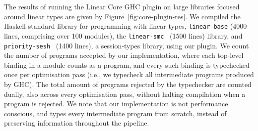 \documentclass[acmsmall,review,anonymous,screen]{acmart}
\begin{document}

The results of running the Linear Core GHC plugin on large 
libraries focused around linear types are given by
Figure~\ref{fig:core-plugin-res}.
%
%
We compiled the Haskell standard library for programming with linear types,
\texttt{linear-base} (4000 lines, comprising over 100 modules), the
\texttt{linear-smc}~\cite{10.1145/3471874.3472980} (1500 lines) library, and
\texttt{priority-sesh}~\cite{10.1145/3471874.3472979} (1400 lines), a
session-types library, using our plugin.
%
We count the number of programs accepted by our implementation, where
each top-level binding in a module counts as a program, and every such
binding is typechecked once per optimisation pass (i.e., we typecheck
all intermediate programs produced by GHC). The total amount of programs
rejected by the typechecker are counted dually, also across every optimisation
pass, without halting compilation when a program is rejected. We note that our
implementation is not performance conscious, and types every intermediate
program from scratch, instead of preserving information throughout the
pipeline.

\end{document}
